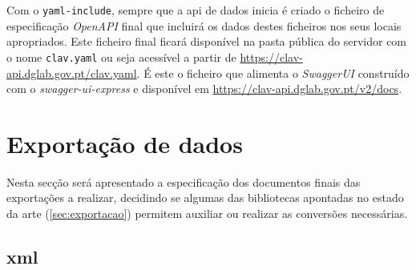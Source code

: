 Com o \texttt{yaml-include}, sempre que a \acrshort{api} de dados inicia é criado o ficheiro de especificação \textit{OpenAPI} final que incluirá os dados destes ficheiros nos seus locais apropriados. Este ficheiro final ficará disponível na pasta pública do servidor com o nome \texttt{clav.yaml} ou seja acessível a partir de \url{https://clav-api.dglab.gov.pt/clav.yaml}. É este o ficheiro que alimenta o \textit{SwaggerUI} construído com o \textit{swagger-ui-express} e disponível em \url{https://clav-api.dglab.gov.pt/v2/docs}.

\section{Exportação de dados}

Nesta secção será apresentado a especificação dos documentos finais das exportações a realizar, decidindo se algumas das bibliotecas apontadas no estado da arte (\ref{sec:exportacao}) permitem auxiliar ou realizar as conversões necessárias.

\subsection{\acrshort{xml}}

